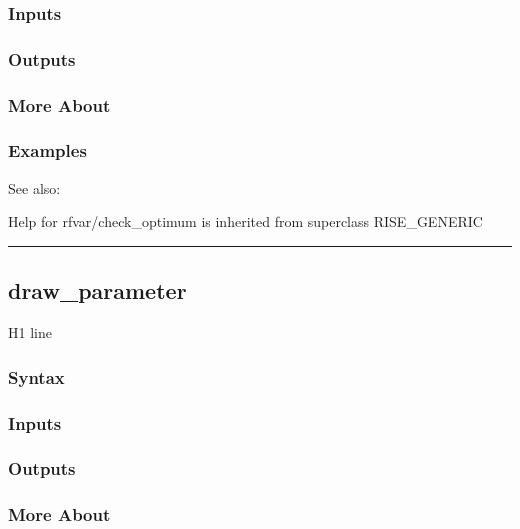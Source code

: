 \documentclass[letterpaper,10pt,english]{sphinxmanual}
\begin{document}
\subsubsection{Inputs}
\label{classes/models/@rfvar/rfvar:id4}

\subsubsection{Outputs}
\label{classes/models/@rfvar/rfvar:id5}

\subsubsection{More About}
\label{classes/models/@rfvar/rfvar:id6}

\subsubsection{Examples}
\label{classes/models/@rfvar/rfvar:id7}
See also:

Help for rfvar/check\_optimum is inherited from superclass RISE\_GENERIC


\bigskip\hrule{}\bigskip



\subsection{draw\_parameter}
\label{classes/models/@rfvar/rfvar:id8}\label{classes/models/@rfvar/rfvar:draw-parameter}
H1 line


\subsubsection{Syntax}
\label{classes/models/@rfvar/rfvar:id9}

\subsubsection{Inputs}
\label{classes/models/@rfvar/rfvar:id10}

\subsubsection{Outputs}
\label{classes/models/@rfvar/rfvar:id11}

\subsubsection{More About}
\label{classes/models/@rfvar/rfvar:id12}
\end{document}
